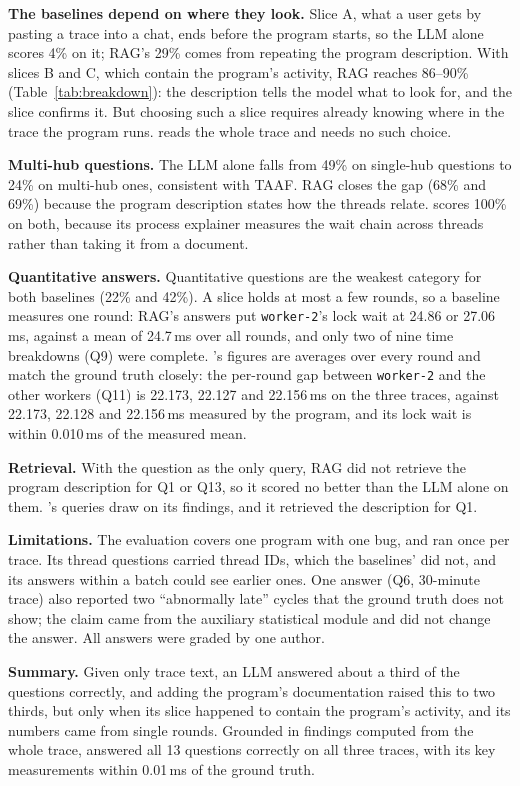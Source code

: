 \textbf{The baselines depend on where they look.} Slice A, what a user
gets by pasting a trace into a chat, ends before the program starts, so
the LLM alone scores 4\% on it; RAG's 29\% comes from repeating the
program description. With slices B and C, which contain the program's
activity, RAG reaches 86--90\% (Table~\ref{tab:breakdown}): the
description tells the model what to look for, and the slice confirms it. But
choosing such a slice requires already knowing where in the trace the
program runs. \sysname reads the whole trace and needs no such choice.

\textbf{Multi-hub questions.} The LLM alone falls from 49\% on single-hub
questions to 24\% on multi-hub ones, consistent with TAAF. RAG closes the
gap (68\% and 69\%) because the program description states how the
threads relate. \sysname scores 100\% on both, because its process
explainer measures the wait chain across threads rather than taking it
from a document.

\textbf{Quantitative answers.} Quantitative questions are the weakest
category for both baselines (22\% and 42\%). A slice holds at most a few
rounds, so a baseline measures one round: RAG's answers put
\texttt{worker-2}'s lock wait at 24.86 or 27.06\,ms, against a mean of
24.7\,ms over all rounds, and only two of nine time breakdowns (Q9) were
complete. \sysname's figures are averages over every round and match the
ground truth closely: the per-round gap between \texttt{worker-2} and the
other workers (Q11) is 22.173, 22.127 and 22.156\,ms on the three traces,
against 22.173, 22.128 and 22.156\,ms measured by the program, and its
lock wait is within 0.010\,ms of the measured mean.

\textbf{Retrieval.} With the question as the only query, RAG did not
retrieve the program description for Q1 or Q13, so it scored no better
than the LLM alone on them. \sysname's queries draw on its findings, and
it retrieved the description for Q1.

\textbf{Limitations.} The evaluation covers one program with one bug, and
\sysname ran once per trace. Its thread questions carried thread IDs,
which the baselines' did not, and its answers within a batch could see
earlier ones. One \sysname answer (Q6, 30-minute trace) also reported two
``abnormally late'' cycles that the ground truth does not show; the claim
came from the auxiliary statistical module and did not change the answer.
All answers were graded by one author.

\textbf{Summary.} Given only trace text, an LLM answered about a third of
the questions correctly, and adding the program's documentation raised
this to two thirds, but only when its slice happened to contain the
program's activity, and its numbers came from single rounds. Grounded in
findings computed from the whole trace, \sysname answered all 13 questions
correctly on all three traces, with its key measurements within 0.01\,ms
of the ground truth.
